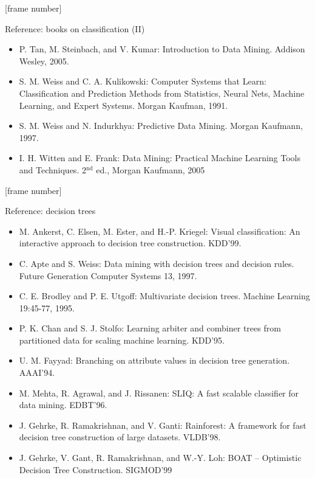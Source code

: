 \documentclass[aspectratio=169,t,table]{beamer}
\begin{document}
  {
    [frame number]
    \begin{frame}{Reference: books on classification (II)}
      \begin{itemize}
        \item P. Tan, M. Steinbach, and V. Kumar: Introduction to Data Mining. Addison Wesley, 2005.
        \item S. M. Weiss and C. A. Kulikowski: Computer Systems that Learn: Classification and Prediction Methods from Statistics, Neural Nets, Machine Learning, and Expert Systems. Morgan Kaufman, 1991.
        \item S. M. Weiss and N. Indurkhya: Predictive Data Mining. Morgan Kaufmann, 1997.
        \item I. H. Witten and E. Frank: Data Mining: Practical Machine Learning Tools and Techniques. 2$^\text{nd}$ ed., Morgan Kaufmann, 2005
      \end{itemize}
    \end{frame}
  }

  {
    [frame number]
    \begin{frame}{Reference: decision trees}
      \begin{itemize}
        \item M. Ankerst, C. Elsen, M. Ester, and H.-P. Kriegel: Visual classification: An interactive approach to decision tree construction. KDD'99.
        \item C. Apte and S. Weiss: Data mining with decision trees and decision rules. Future Generation Computer Systems 13, 1997.
        \item C. E. Brodley and P. E. Utgoff: Multivariate decision trees. Machine Learning 19:45-77, 1995.
        \item P. K. Chan and S. J. Stolfo: Learning arbiter and combiner trees from partitioned data for scaling machine learning. KDD'95.
        \item U. M. Fayyad: Branching on attribute values in decision tree generation. AAAI'94.
        \item M. Mehta, R. Agrawal, and J. Rissanen: SLIQ: A fast scalable classifier for data mining. EDBT'96.
        \item J. Gehrke, R. Ramakrishnan, and V. Ganti: Rainforest: A framework for fast decision tree construction of large datasets. VLDB'98.
        \item J. Gehrke, V. Gant, R. Ramakrishnan, and W.-Y. Loh: BOAT -- Optimistic Decision Tree Construction. SIGMOD'99
      \end{itemize}
    \end{frame}
  }
\end{document}
